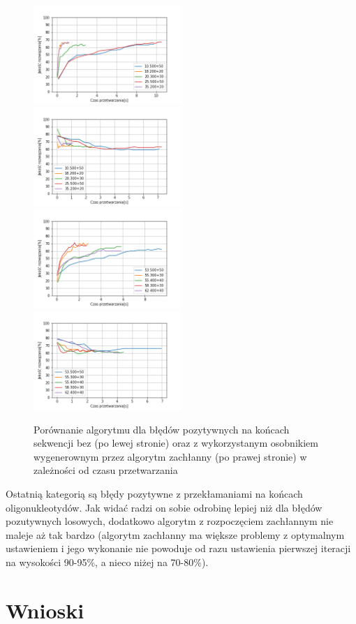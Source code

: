 \documentclass{article}
\begin{document}
\begin{figure}[H]
\includegraphics[width=0.5\textwidth]{Czaspoz-oli1.png}
\includegraphics[width=0.5\textwidth]{Czaspoz-oli-greedy1.png}
\includegraphics[width=0.5\textwidth]{Czaspoz-oli2.png}
\includegraphics[width=0.5\textwidth]{Czaspoz-oli-greedy2.png}
\caption{Porównanie algorytmu dla błędów pozytywnych na końcach sekwencji bez (po lewej stronie) oraz z wykorzystanym osobnikiem wygenerownym przez algorytm zachłanny (po prawej stronie) w zależności od czasu przetwarzania}
\end{figure}
Ostatnią kategorią są błędy pozytywne z przekłamaniami na końcach oligonukleotydów. Jak widać radzi on sobie odrobinę lepiej niż dla błędów pozutywnych losowych, dodatkowo algorytm z rozpoczęciem zachłannym nie maleje aż tak bardzo (algorytm zachłanny ma większe problemy z optymalnym ustawieniem i jego wykonanie nie powoduje od razu ustawienia pierwszej iteracji na wysokości 90-95\%, a nieco niżej na 70-80\%).
\section{Wnioski}
\end{document}
